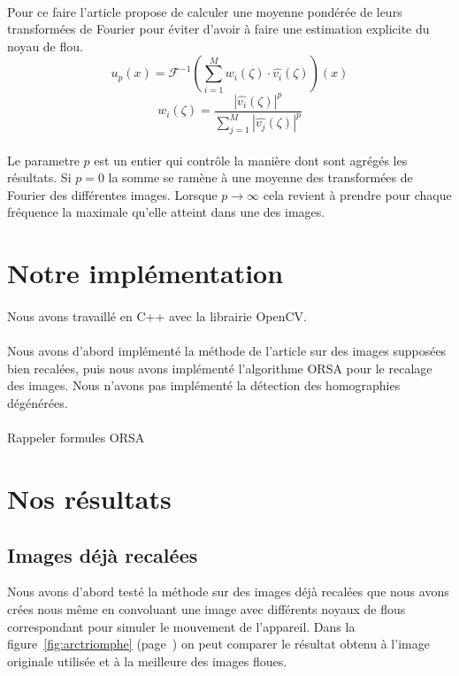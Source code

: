 \documentclass[a4paper,10pt]{report}
\begin{document}
\paragraph{}
Pour ce faire l'article propose de calculer une moyenne pondérée de leurs transformées 
de Fourier pour éviter d'avoir à faire une estimation explicite du noyau de flou.
\[
  u_{p}(x) = \mathcal{F}^{-1}\left(\sum_{i=1}^M w_{i}(\zeta)\cdot \hat{v_{i}}(\zeta)\right)(x)
\]
\[
  w_{i}(\zeta) = \frac{|\hat{v_{i}}(\zeta)|^p}{\sum_{j=1}^M |\hat{v_{j}}(\zeta)|^p}
\]

\paragraph{}
Le parametre \(p\) est un entier qui contrôle la manière dont sont agrégés les résultats. Si \(p = 0\) la somme 
se ramène à une moyenne des transformées de Fourier des différentes images. Lorsque \(p \rightarrow \infty \) 
cela revient à prendre pour chaque fréquence la maximale qu'elle atteint dans une des images. 

\section{Notre implémentation }
\paragraph{}
Nous avons travaillé en C++ avec la librairie OpenCV.
\paragraph{}
Nous avons d'abord implémenté la méthode de l'article sur des images supposées bien recalées, puis
nous avons implémenté l'algorithme ORSA pour le recalage des images. 
Nous n'avons pas implémenté la détection des homographies dégénérées.
\\\\
Rappeler formules ORSA

\section{Nos résultats}

\subsection{Images déjà recalées}
Nous avons d'abord testé la méthode sur des images déjà recalées que nous avons crées
nous même en convoluant une image avec différents noyaux de flous correspondant pour simuler 
le mouvement de l'appareil. Dans la figure~\ref{fig:arctriomphe}
(page~\pageref{fig:arctriomphe}) on peut comparer le résultat obtenu à
l'image originale utilisée et à la meilleure des images floues.
\end{document}
